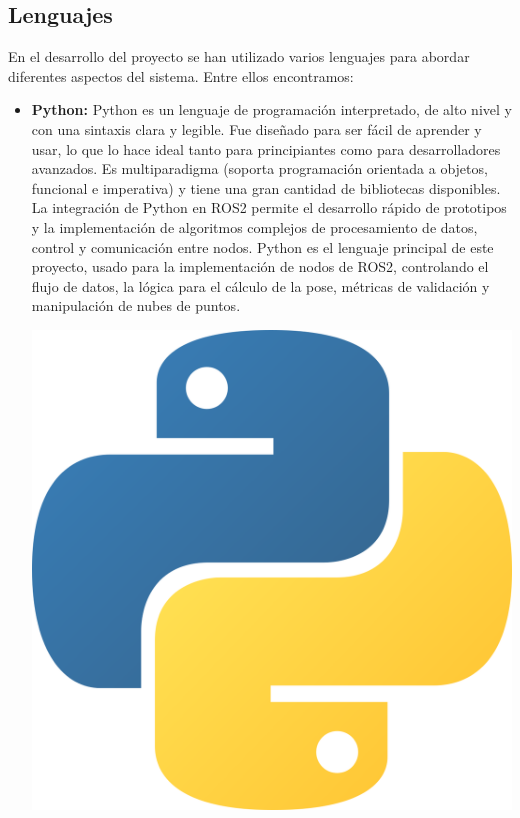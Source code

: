 \documentclass[12pt, a4paper, twoside]{article}
\begin{document}
\subsection{Lenguajes}
En el desarrollo del proyecto se han utilizado varios lenguajes para abordar diferentes aspectos del sistema.
Entre ellos encontramos:

\begin{itemize}
  \item 
  \begin{minipage}[l]{0.7\textwidth}
    \textbf{Python:} 
      Python es un lenguaje de programación interpretado, de alto nivel y con una sintaxis clara y legible. 
      Fue diseñado para ser fácil de aprender y usar, lo que lo hace ideal tanto para principiantes como para desarrolladores 
      avanzados. Es multiparadigma (soporta programación orientada a objetos, funcional e imperativa) y tiene una gran cantidad 
      de bibliotecas disponibles. La integración de Python en ROS2 permite el desarrollo rápido de prototipos y la implementación
      de algoritmos complejos de procesamiento de datos, control y comunicación entre nodos. Python es el lenguaje principal
      de este proyecto, usado para la implementación de nodos de ROS2, controlando el flujo de datos, la lógica para el cálculo 
      de la pose, métricas de validación y manipulación de nubes de puntos.
  \end{minipage}
  \hspace{1em}
  \begin{minipage}[r]{0.28\textwidth}
    \includegraphics[width=\linewidth]{Python_logo.png}

\end{minipage}
\end{itemize}
\end{document}
